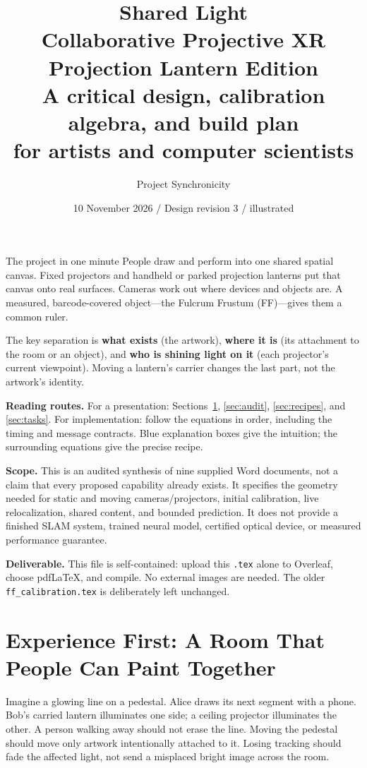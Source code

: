 \documentclass[11pt,a4paper]{article}
\title{\Huge\textbf{Shared Light}\\[4pt]
  \Large Collaborative Projective XR\\[2pt]
  \large Projection Lantern Edition\\[8pt]
  \large A critical design, calibration algebra, and build plan\\
  for artists and computer scientists}
\author{Project Synchronicity}
\date{10 November 2026 / Design revision 3 / illustrated}
\begin{document}
\maketitle
\begin{plain}{The project in one minute}
People draw and perform into one shared spatial canvas. Fixed projectors and
handheld or parked projection lanterns put that canvas onto real surfaces. Cameras work out
where devices and objects are. A measured, barcode-covered object---the
Fulcrum Frustum (FF)---gives them a common ruler.

The key separation is \textbf{what exists} (the artwork), \textbf{where it is}
(its attachment to the room or an object), and \textbf{who is shining light
on it} (each projector's current viewpoint). Moving a lantern's carrier
changes the last part, not the artwork's identity.
\end{plain}

\textbf{Reading routes.} For a presentation: Sections~\ref{sec:experience},
\ref{sec:audit}, \ref{sec:recipes}, and \ref{sec:tasks}.
For implementation: follow the equations in order, including the timing and
message contracts. Blue explanation boxes give the intuition; the surrounding
equations give the precise recipe.

\textbf{Scope.} This is an audited synthesis of nine supplied Word documents,
not a claim that every proposed capability already exists. It specifies the
geometry needed for static and moving cameras/projectors, initial calibration,
live relocalization, shared content, and bounded prediction. It does not
provide a finished SLAM system, trained neural model, certified optical
device, or measured performance guarantee.

\textbf{Deliverable.} This file is self-contained: upload this \texttt{.tex}
alone to Overleaf, choose pdfLaTeX, and compile. No external images are needed.
The older \texttt{ff\_calibration.tex} is deliberately left unchanged.

\clearpage
\tableofcontents
\clearpage

\section{Experience First: A Room That People Can Paint Together}
\label{sec:experience}

Imagine a glowing line on a pedestal. Alice draws its next segment with a
phone. Bob's carried lantern illuminates one side; a ceiling projector
illuminates the other. A person walking away should not erase the line.
Moving the pedestal should move only artwork intentionally attached to it.
Losing tracking should fade the affected light, not send a misplaced bright
image across the room.
\end{document}
